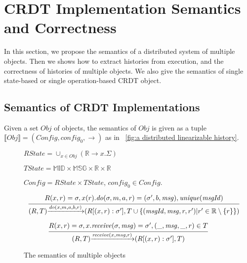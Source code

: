
\section{CRDT Implementation Semantics and Correctness}
\label{sec:CRDT implementation semantics and correctness} 

In this section, we propose the semantics of a distributed system of multiple objects. Then we shows how to extract histories from execution, and the correctness of histories of multiple objects. We also give the semantics of single state-based or single operation-based CRDT object. 





\subsection{Semantics of CRDT Implementations}
\label{subsec:CRDT implementations} 

 Given a set $\mathit{Obj}$ of objects, the semantics of $\mathit{Obj}$ is given as a tuple $\llbracket \mathit{Obj} \rrbracket = (\mathit{Config},\mathit{config}_0,\rightarrow)$ as in \figurename~\ref{fig:a distributed linearizable history}.

\begin{figure}[ht]
$\mathit{RState} = \cup_{x \in \mathit{Obj}} (\mathbb{R} \rightarrow x.\Sigma)$

$\mathit{TState} = \mathbb{MID} \times \mathbb{MSG} \times \mathbb{R} \times \mathbb{R}$

$\mathit{Config} = \mathit{RState} \times \mathit{TState}$, $\mathit{config}_0 \in \mathit{Config}$.


\[
\begin{array}{l c}
\bigfrac{ R(x,r) = \sigma, x(r).\mathit{do}(\sigma,m,a,r) = (\sigma',b,\mathit{msg}), \mathit{unique}(\mathit{msgId}) }
{ (R,T) {\xrightarrow{\mathit{do}(x,m,a,b,r)}} (R[(x,r):\sigma'],T \cup \{ (\mathit{msgId},\mathit{msg},r,r') \vert r' \in \mathbb{R} \setminus \{ r \} \}) }
\end{array}
\]

\[
\begin{array}{l c}
\bigfrac{ R(x,r) = \sigma, x.\mathit{receive}(\sigma,\mathit{msg}) = \sigma',(\_,\mathit{msg},\_,r) \in T}
{ (R,T) {\xrightarrow{\mathit{receive}(x,\mathit{msg},r)}} (R[(x,r):\sigma'],T) }
\end{array}
\]
\caption{The semantics of multiple objects}
\label{fig:the semantics of multiple objects}
\end{figure}

